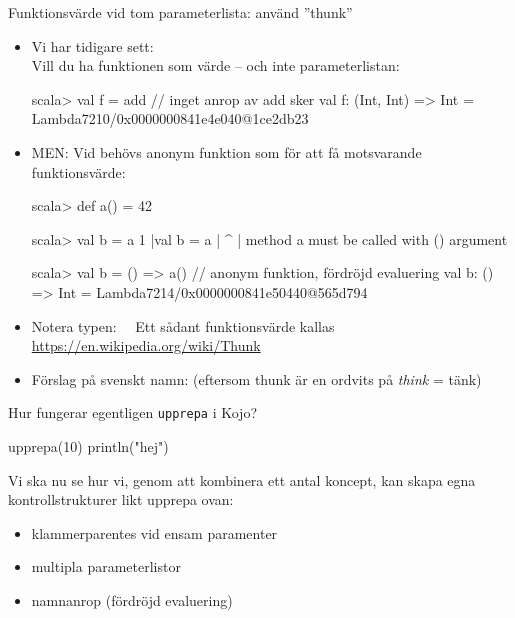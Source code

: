 \begin{Slide}{Funktionsvärde vid tom parameterlista: använd ''thunk''}\SlideFontTiny
\begin{itemize}\SlideFontTiny

\item Vi har tidigare sett: \\Vill du ha funktionen som värde --  och inte parameterlistan:
\begin{REPLsmall}
scala> val f = add     // inget anrop av add sker 
val f: (Int, Int) => Int = Lambda7210/0x0000000841e4e040@1ce2db23
\end{REPLsmall}
\pause
\item MEN: Vid  behövs anonym funktion som  för att få motsvarande funktionsvärde: 
\begin{REPLsmall}
scala> def a() = 42

scala> val b = a
1 |val b = a
  |        ^
  |        method a must be called with () argument

scala> val b = () => a()   // anonym funktion, fördröjd evaluering
val b: () => Int = Lambda7214/0x0000000841e50440@565d794
\end{REPLsmall} \pause
\item Notera typen:  ~~Ett sådant funktionsvärde kallas \\ \url{https://en.wikipedia.org/wiki/Thunk} 
\item Förslag på svenskt namn:    (eftersom thunk är en ordvits på \emph{think} = tänk)
\end{itemize}
\end{Slide}




\begin{Slide}{Hur fungerar egentligen \texttt{upprepa} i Kojo?}
\begin{Code}[basicstyle=\ttfamily\SlideFontSize{14}{16}]
upprepa(10) {
  println("hej")
}
\end{Code}

\pause
Vi ska nu se hur vi, genom att kombinera ett antal koncept, kan skapa egna kontrollstrukturer likt upprepa ovan:
\begin{itemize}
\item klammerparentes vid ensam paramenter
\item multipla parameterlistor
\item namnanrop (fördröjd evaluering)
\end{itemize}
\end{Slide}



